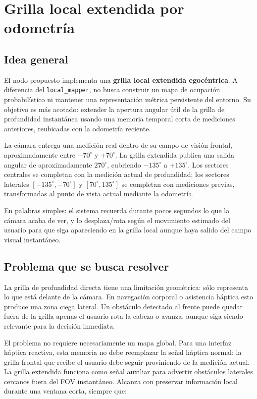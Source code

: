 \section{Grilla local extendida por odometría}

\subsection{Idea general}

El nodo propuesto implementa una \textbf{grilla local extendida egocéntrica}. A diferencia del
\texttt{local\_mapper}, no busca construir un mapa de ocupación probabilístico ni mantener
una representación métrica persistente del entorno. Su objetivo es más acotado: extender
la apertura angular útil de la grilla de profundidad instantánea usando una memoria temporal
corta de mediciones anteriores, reubicadas con la odometría reciente.

La cámara entrega una medición real dentro de su campo de visión frontal, aproximadamente
entre \(-70^\circ\) y \(+70^\circ\). La grilla extendida publica una salida angular de
aproximadamente \(270^\circ\), cubriendo \(-135^\circ\) a \(+135^\circ\). Los sectores
centrales se completan con la medición actual de profundidad; los sectores laterales
\([-135^\circ,-70^\circ]\) y \([70^\circ,135^\circ]\) se completan con mediciones previas,
transformadas al punto de vista actual mediante la odometría.

En palabras simples: el sistema recuerda durante pocos segundos lo que la cámara acaba de
ver, y lo desplaza/rota según el movimiento estimado del usuario para que siga apareciendo
en la grilla local aunque haya salido del campo visual instantáneo.

\subsection{Problema que se busca resolver}

La grilla de profundidad directa tiene una limitación geométrica: sólo representa lo que
está delante de la cámara. En navegación corporal o asistencia háptica esto produce una
zona ciega lateral. Un obstáculo detectado al frente puede quedar fuera de la grilla apenas
el usuario rota la cabeza o avanza, aunque siga siendo relevante para la decisión inmediata.

El problema no requiere necesariamente un mapa global. Para una interfaz háptica reactiva,
esta memoria no debe reemplazar la señal háptica normal: la grilla frontal que recibe el
usuario debe seguir proviniendo de la medición actual. La grilla extendida funciona como
señal auxiliar para advertir obstáculos laterales cercanos fuera del FOV instantáneo. Alcanza
con preservar información local durante una ventana corta, siempre que:

